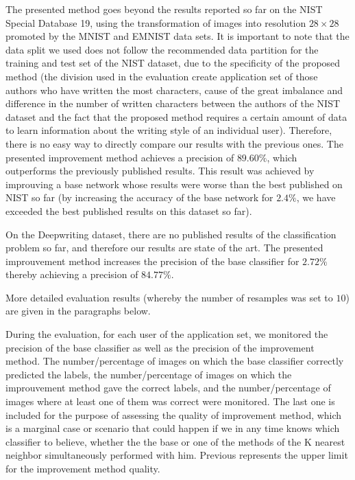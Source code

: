 \documentclass{article}
\begin{document}
The presented method goes beyond the results reported so far on the NIST Special Database 19, using the transformation of images into resolution $28 \times 28$ promoted by the MNIST and EMNIST data sets.
It is important to note that the data split we used does not follow the recommended data partition for the training and test set of the NIST dataset, due to the specificity of the proposed method
(the division used in the evaluation create application set of those authors who have written the most characters, cause of the great imbalance and difference
in the number of written characters between the authors of the NIST dataset and
the fact that the proposed method requires a certain amount of data to learn information about the writing style of an individual user).
Therefore, there is no easy way to directly compare our results with the previous ones. %
The presented improvement method achieves a precision of $89.60\%$, which outperforms the previously published results.
This result was achieved by improuving a base network whose results were worse than the best published on NIST so far
(by increasing the accuracy of the base network for $2.4\%$, we have exceeded the best published results on this dataset so far).

On the Deepwriting dataset, there are no published results of the classification problem so far, and therefore our results are state of the art.
The presented improuvement method increases the precision of the base classifier for $2.72\%$ thereby achieving a precision of $84.77\%$.

More detailed evaluation results (whereby the number of resamples was set to $10$) are given in the paragraphs below.

During the evaluation, for each user of the application set, we monitored the precision of the base classifier as well as the precision of the improvement method.
The number/percentage of images on which the base classifier correctly predicted the labels, the number/percentage of images on which the improuvement method gave the correct labels,
and the number/percentage of images where at least one of them was correct were monitored.
The last one is included for the purpose of assessing the quality of improvement method,
which is a marginal case or scenario that could happen if we in any time knows which classifier to believe,
whether the the base or one of the methods of the K nearest neighbor simultaneously performed with him.
Previous represents the upper limit for the improvement method quality.
\end{document}
